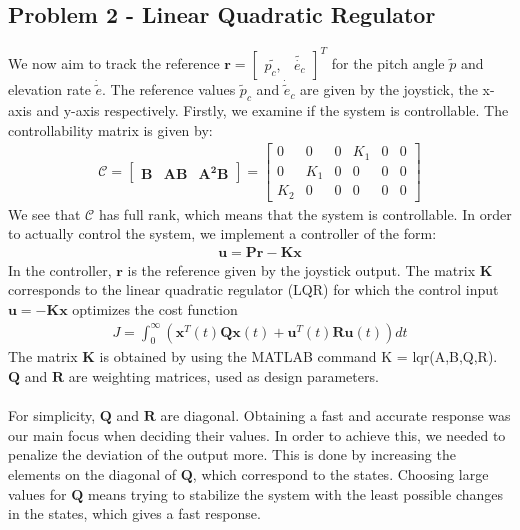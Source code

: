 \subsection{Problem 2 - Linear Quadratic Regulator}
We now aim to track the reference $\mathbf{r}
= \begin{bmatrix} \tilde{p_c,} & \tilde{\dot{e_c}}
\end{bmatrix}^T$ for the pitch angle $\tilde{p}$ and elevation rate $\dot{\tilde{e}}$. The reference values $\tilde{p}_c$ and $\dot{\tilde{e}}_c$ are given by the joystick, the x-axis and y-axis respectively. Firstly, we examine if the system is controllable. The controllability matrix is given by:
\begin{gather*}
    \mathcal{C} = 
    \begin{bmatrix} \mathbf{B} & \mathbf{AB} &
    \mathbf{A^2B} \end{bmatrix}
    = \begin{bmatrix}
    0 & 0 & 0 & K_1 & 0 & 0 \\
    0 & K_1 & 0 & 0 & 0 & 0 \\
    K_2 & 0 & 0 & 0 & 0 & 0
    \end{bmatrix}
\end{gather*}
We see that $\mathcal{C}$ has full rank, which means that the system is controllable. In order to actually control the system, we implement a controller of the form:
\begin{gather*}
    \mathbf{u} = \mathbf{Pr} - \mathbf{Kx}
\end{gather*}
In the controller, $\mathbf{r}$ is the reference given by the joystick output. The matrix $\mathbf{K}$ corresponds to the linear quadratic regulator (LQR) for which the control input $\mathbf{u} = -\mathbf{Kx}$ optimizes the cost function
\begin{gather*}
    \mathit{J} = \int_{0}^{\infty}(\mathbf{x}^T(t)
    \mathbf{Qx}(t) + \mathbf{u}^T(t)\mathbf{Ru}(t))
    \mathit{dt}
\end{gather*}
The matrix $\mathbf{K}$ is obtained by using the MATLAB command K = lqr(A,B,Q,R). $\mathbf{Q}$ and $\mathbf{R}$ are weighting matrices, used as design parameters. \\
\\For simplicity, $\mathbf{Q}$ and $\mathbf{R}$ are diagonal. Obtaining a fast and accurate response was our main focus when deciding their values. In order to achieve this, we needed to penalize the deviation of the output more. This is done by increasing the elements on the diagonal of $\mathbf{Q}$, which correspond to the states. Choosing large values for $\mathbf{Q}$ means trying to stabilize the system with the least possible changes in the states, which gives a fast response.\\ 
